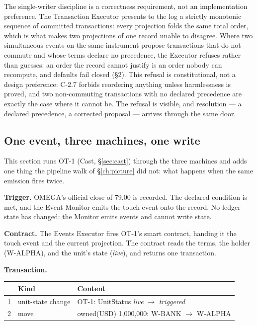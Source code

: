 \documentclass[11pt,a4paper]{article}
\begin{document}
The single-writer discipline is a correctness requirement, not an
implementation preference. The Transaction Executor presents to the log a
strictly monotonic sequence of committed transactions: every projection folds
the same total order, which is what makes two projections of one record unable
to disagree. Where two simultaneous events on the same instrument propose
transactions that do not commute and whose terms declare no precedence, the
Executor refuses rather than guesses: an order the record cannot justify is an
order nobody can recompute, and defaults fail closed (\S2). This refusal is
constitutional, not a design preference: C-2.7 forbids reordering anything unless
harmlessness is proved, and two non-commuting transactions with no declared
precedence are exactly the case where it cannot be. The refusal is
visible, and resolution --- a declared precedence, a corrected proposal ---
arrives through the same door.

\subsection{One event, three machines, one write}

This section runs OT-1 (Cast, \S\ref{sec:cast}) through the three machines and adds one
thing the pipeline walk of \S\ref{ch:picture} did not: what happens when the same emission
fires twice.

\textbf{Trigger.} OMEGA's official close of 79.00 is recorded. The declared
condition is met, and the Event Monitor emits the touch event onto the record.
No ledger state has changed: the Monitor emits events and cannot write state.

\textbf{Contract.} The Events Executor fires OT-1's smart contract, handing it
the touch event and the current projection. The contract reads the terms, the
holder (\mbox{W-ALPHA}), and the unit's state (\emph{live}), and returns one
transaction.

\textbf{Transaction.}

\begin{center}
\begin{tabular}{@{}rll@{}}
\toprule
 & Kind & Content \\
\midrule
1 & unit-state change & OT-1: UnitStatus \emph{live} $\to$ \emph{triggered} \\
2 & move & owned(USD) 1{,}000{,}000: W-BANK $\to$ W-ALPHA \\
\bottomrule
\end{tabular}
\end{center}
\end{document}
